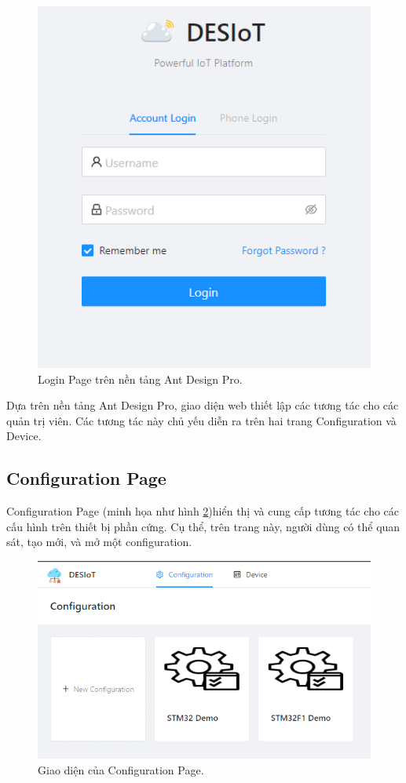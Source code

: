 \begin{figure}[htp]
\centering
\includegraphics[width=0.7\linewidth]{images/fig-adp-default-loginpage.png}
\caption{Login Page trên nền tảng Ant Design Pro.}
\label{fig:adp-default-mainpage}
\end{figure}

Dựa trên nền tảng Ant Design Pro, giao diện web thiết lập các tương tác cho các quản trị viên. Các tương tác này chủ yếu diễn ra trên hai trang Configuration và Device.

\subsection{Configuration Page}

Configuration Page (minh họa như hình \ref{fig:config-page})hiển thị và cung cấp tương tác cho các cấu hình trên thiết bị phần cứng. Cụ thể, trên trang này, người dùng có thể quan sát, tạo mới, và mở một configuration.

\begin{figure}[htp]
\centering
\includegraphics[width=0.7\linewidth]{images/fig-config-page.png}
\caption{Giao diện của Configuration Page.}
\label{fig:config-page}
\end{figure}

